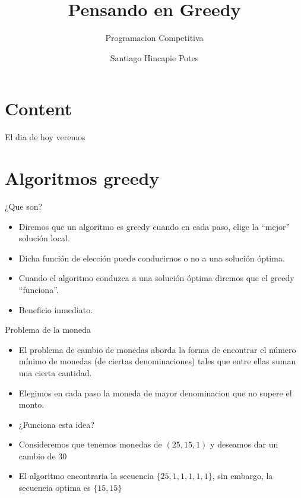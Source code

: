 \documentclass{beamer}
\title{Pensando en Greedy}
\subtitle{Programacion Competitiva}
\author{Santiago Hincapie Potes}
\institute{Universidad EAFIT}
\date{\displaydate{date}}
\begin{document}
\maketitle

\section*{Content}
\begin{frame}{El dia de hoy veremos}
  \tableofcontents[hideallsubsections]
\end{frame}

\section{Algoritmos greedy}
\begin{frame}{¿Que son?}
  \begin{itemize}
  \item Diremos que un algoritmo es greedy cuando en cada paso, elige la
    ``mejor'' solución local.
    \pause
  \item Dicha función de elección puede conducirnos o no a una solución
    óptima.
    \pause
  \item Cuando el algoritmo conduzca a una solución óptima diremos que
    el greedy ``funciona''.
    \pause
  \item Beneficio inmediato.
  \end{itemize}
\end{frame}

\begin{frame}{Problema de la moneda}
  \begin{itemize}
  \item El problema de cambio de monedas aborda la forma de encontrar el número mínimo
    de monedas (de ciertas denominaciones) tales que entre ellas suman una cierta
    cantidad. \pause
  \item Elegimos en cada paso la moneda de mayor denominacion que no supere el monto.
    \pause
  \item ¿Funciona esta idea?
    \pause
  \item Consideremos que tenemos monedas de $(25, 15, 1)$ y deseamos dar un cambio de $30$
    \pause
  \item El algoritmo encontraria la secuencia $\{25, 1, 1, 1, 1, 1\}$, sin embargo,
    la secuencia optima es $\{15, 15\}$
  \end{itemize}
\end{frame}
\end{document}
